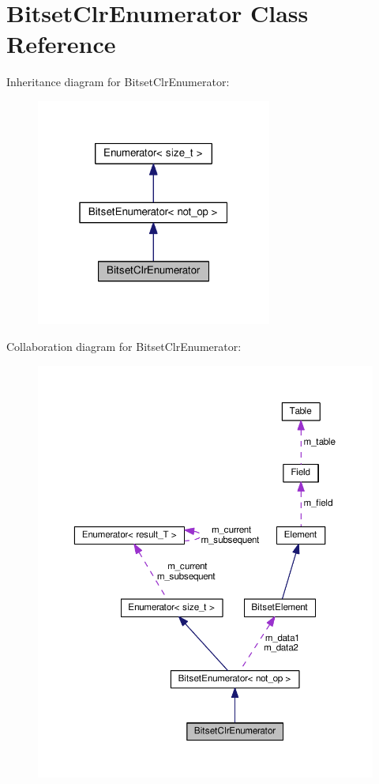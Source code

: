 \hypertarget{classBitsetClrEnumerator}{}\section{Bitset\+Clr\+Enumerator Class Reference}
\label{classBitsetClrEnumerator}


Inheritance diagram for Bitset\+Clr\+Enumerator\+:
\nopagebreak
\begin{figure}[H]
\begin{center}
\leavevmode
\includegraphics[width=220pt]{classBitsetClrEnumerator__inherit__graph}
\end{center}
\end{figure}


Collaboration diagram for Bitset\+Clr\+Enumerator\+:
\nopagebreak
\begin{figure}[H]
\begin{center}
\leavevmode
\includegraphics[width=350pt]{classBitsetClrEnumerator__coll__graph}
\end{center}
\end{figure}
